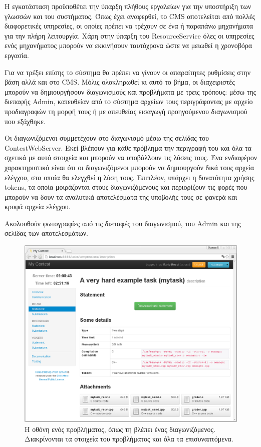 \documentclass[diploma]{softlab-thesis}
\begin{document}
Η εγκατάσταση προϋποθέτει την ύπαρξη πλήθους εργαλείων για την υποστήριξη των
γλωσσών και του συστήματος. Όπως έχει αναφερθεί, το CMS αποτελείται από πολλές
διαφορετικές υπηρεσίες, οι οποίες πρέπει να τρέχουν σε ένα ή παραπάνω μηχανήματα
για την πλήρη λειτουργία. Χάρη στην ύπαρξη του ResourceService όλες οι υπηρεσίες
ενός μηχανήματος μπορούν να εκκινήσουν ταυτόχρονα ώστε να μειωθεί η χρονοβόρα
εργασία.

\bigskip

Για να τρέξει επίσης το σύστημα θα πρέπει να γίνουν οι απαραίτητες ρυθμίσεις
στην βάση αλλά και στο CMS. Μόλις ολοκληρωθεί κι αυτό το βήμα, οι διαχειριστές
μπορούν να δημιουργήσουν διαγωνισμούς και προβλήματα με τρεις τρόπους: μέσω της
διεπαφής Admin, κατευθείαν από το σύστημα αρχείων τους περιγράφοντας με αρχείο
προδιαγραφών τη μορφή τους ή με απευθείας εισαγωγή προηγούμενου διαγωνισμού που
εξάχθηκε.

\bigskip

Οι διαγωνιζόμενοι συμμετέχουν στο διαγωνισμό μέσω της σελίδας του
ContestWebServer. Εκεί βλέπουν για κάθε πρόβλημα την περιγραφή του και όλα
τα σχετικά με αυτό στοιχεία και μπορούν να υποβάλλουν τις λύσεις τους. Ένα
ενδιαφέρον χαρακτηριστικό είναι ότι οι διαγωνιζόμενοι μπορούν να δημιουργούν
δικά τους αρχεία ελέγχου, στα οποία θα ελεγχθεί η λύση τους. Επιπλέον, υπάρχει
η δυνατότητα χρήσης tokens, τα οποία μοιράζονται στους διαγωνιζόμενους και
περιορίζουν τις φορές που μπορούν να δουν τα αναλυτικά αποτελέσματα της
υποβολής τους σε φανερά και κρυφά αρχεία ελέγχου.

\bigskip

Ακολουθούν φωτογραφίες από τις διεπαφές του διαγωνισμού, του Admin και της σελίδας
των αποτελεσμάτων.

\bigskip

\begin{figure}
  \centering
  \includegraphics[scale=0.3]{Figures/cmscontestant.png}
  \caption[Οθοόνη προβλήματος CMS]{Η οθόνη ενός προβλήματος, όπως τη βλέπει ένας
  διαγωνιζόμενος. Διακρίνονται τα στοιχεία του προβλήματος και όλα τα
  επισυναπτόμενα.}
\end{figure}
\end{document}
